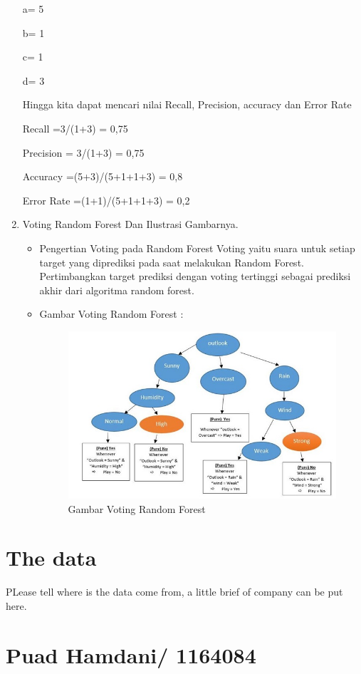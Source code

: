 \begin{enumerate}
a= 5

b= 1

c= 1

d= 3

Hingga kita dapat mencari nilai Recall, Precision, accuracy dan Error Rate

Recall =3/(1+3) = 0,75

Precision = 3/(1+3) = 0,75

Accuracy =(5+3)/(5+1+1+3) = 0,8

Error Rate =(1+1)/(5+1+1+3) = 0,2

\item Voting Random Forest Dan Ilustrasi Gambarnya.

\begin{itemize}
\item Pengertian Voting pada Random Forest
Voting yaitu suara untuk setiap target yang diprediksi pada saat melakukan Random Forest. Pertimbangkan target prediksi dengan voting tertinggi sebagai prediksi akhir dari algoritma random forest.

\item Gambar Voting Random Forest :
\begin{figure}[ht]
\centering
\includegraphics[scale=0.8]{figures/c3jesron9.jpg}
\caption{Gambar Voting Random Forest}
\label{contoh}
\end{figure}
\end{itemize}
\end{enumerate}
\section{The data}
PLease tell where is the data come from, a little brief of company can be put here.
\section {Puad Hamdani/ 1164084}
